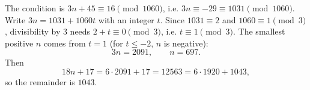 The condition is $3n+45\equiv16\pmod{1060}$, i.e. $3n\equiv-29\equiv1031\pmod{1060}$. Write $3n=1031+1060t$ with an integer $t$. Since $1031\equiv2$ and $1060\equiv1\pmod3$, divisibility by $3$ needs $2+t\equiv0\pmod 3$, i.e. $t\equiv1\pmod3$. The smallest positive $n$ comes from $t=1$ (for $t\le-2$, $n$ is negative):
\[3n=2091,\qquad n=697.\]
Then
\[18n+17=6\cdot2091+17=12563=6\cdot1920+1043,\]
so the remainder is $\boxed{1043}$.

